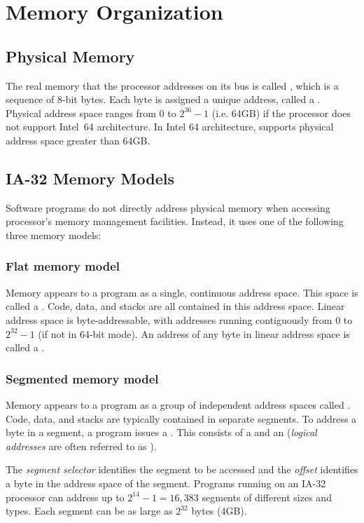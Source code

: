 \chapter{Memory Organization}

\section{Physical Memory}
The real memory that the processor addresses on its bus is called , which is a sequence of 8-bit bytes. Each byte is assigned a unique
address, called a . Physical address space ranges from 0
to $2^{36} - 1$ (i.e. 64GB) if the processor does not support Intel~64
architecture. In Intel 64 architecture, supports physical address space greater than 64GB. 

\section{IA-32 Memory Models}
Software programs do not directly address physical memory when accessing
processor's memory management facilities. 
Instead, it uses one of the following three memory models:
\bit
\w {}
\w {}
\w {}
\eit

\subsection{Flat memory model}
Memory appears to a program as a single, continuous address space. This space
is called a . Code, data, and stacks are all
contained in this address space. Linear address space is byte-addressable,
with addresses running contiguously from 0 to $2^{32} -1$ (if not in 64-bit
mode). An address of any byte in linear address space is called a . 

\subsection{Segmented memory model}
Memory appears to a program as a group of independent address spaces called
. Code, data, and stacks are typically contained in separate
segments. To address a byte in a segment, a program issues a . This consists of a  and an 
({\em logical addresses\/} are often referred to as ). 

The {\em segment selector\/} identifies the segment to be accessed and the
{\em offset\/} identifies a byte in the address space of the segment. Programs
running on an IA-32 processor can address up to $2^{14} - 1 = 16,383$ segments
of different sizes and types. Each segment can be as large as $2^{32}$ bytes
(4GB). 

